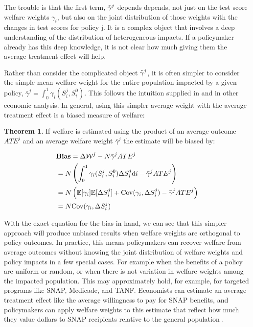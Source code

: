 \documentclass[12pt]{article}
\theoremstyle{definition}
\theoremstyle{definition}
\theoremstyle{definition}
\theoremstyle{definition}
\newtheorem{thm}{Theorem}
\begin{document}
    The trouble is that the first term, $\Tilde{\gamma}^j$ depends depends, not just on the test score welfare weights $\gamma_i$, but also on the joint distribution of those weights with the changes in test scores for policy j. It is a complex object that involves a deep understanding of the distribution of heterogeneous impacts. If a policymaker already has this deep knowledge, it is not clear how much giving them the average treatment effect will help. 

    Rather than consider the complicated object $\Tilde{\gamma}^j$, it is often simpler to consider the simple mean welfare weight for the entire population impacted by a given policy, $\bar{\gamma}^j = \int_0^1 \gamma_i(S_i^j, S_i^0)$. This follows the intuition supplied in \cite{Keyser_2020} and in other economic analysis. In general, using this simpler average weight with the average treatment effect is a biased measure of welfare:
    
  \begin{thm}
    If welfare is estimated using the product of an average outcome $ATE^j$ and an average welfare weight $\bar{\gamma}^j$ the estimate will be biased by: 
    
    \begin{align}
       & \textbf{Bias} = \Delta \mathcal{W}^j - N\bar{\gamma}^j ATE^j \\
       & =  N \left( \int_0^1 \gamma_i(S_i^j, S_i^0) \Delta S^j_i \text{d}i - \bar{\gamma}^j ATE^j \right) \\
       & = N \left( \mathbb{E}[\gamma_i] \mathbb{E}[\Delta S^j_i] + \mathrm{Cov}(\gamma_i, \Delta S^j_i) - \bar{\gamma}^j ATE^j \right) \\
       & = N \mathrm{Cov}(\gamma_i, \Delta S^j_i)
    \end{align}
    \end{thm}

    With the exact equation for the bias in hand, we can see that this simpler approach will produce unbiased results when welfare weights are orthogonal to policy outcomes.   In practice, this means policymakers can recover welfare from average outcomes without knowing the joint distribution of welfare weights and policy impacts in a few special cases.  For example when the benefits of a policy are uniform or random, or when there is not variation in welfare weights among the impacted population. This may approximately hold, for example, for targeted programs like SNAP, Medicade, and TANF. Economists can estimate an average treatment effect like the average willingness to pay for SNAP benefits, and policymakers can apply welfare weights to this estimate that reflect how much they value dollars to SNAP recipients relative to the general population \citep{Keyser_2020}. 
    
\end{document}
